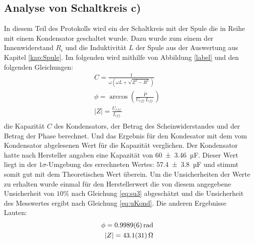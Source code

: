 \subsection{Analyse von Schaltkreis c)}
In diesem Teil des Protokolls wird ein der Schaltkreis mit der Spule die in Reihe mit einem Kondensator geschaltet wurde.
Dazu wurde zum einem der Innenwiderstand $R_i$ und die Induktivität $L$ der Spule aus der Auswertung aus Kapitel \ref{kap:Spule}.
Im folgenden wird mithilfe von Abbildung \ref{label}
und den folgenden Gleichungen:
\begin{align}
C=\frac{1}{\omega (\omega L+\sqrt{Z^2-R^2})}\\	
\phi = \arccos\left(\frac{\bar{P}}{U_{eff.}I_{eff.}}\right)\\
	|Z|=\frac{U_{eff.}}{I_{eff.}}\\	
\end{align}
die Kapazität $C$ des Kondensators, der Betrag des Scheinwiderstandes und der Betrag der Phase berechnet. Und das Ergebnis für den Kondesator mit dem vom Kondensator abgelesenen Wert für die Kapazität verglichen.
Der Kondensator hatte nach Hersteller angaben eine Kapazität von \SI{60+-3.46}{µF}.
Dieser Wert liegt in der $1\sigma$-Umgebung des errechneten Wertes: \SI{57.4+-3.8}{µF} und stimmt somit gut mit dem Theoretischen Wert überein.
Um die Unsicherheiten der Werte zu erhalten wurde einmal für den Herstellerwert die von diesem angegebene Unsicherheit von $10\%$ nach Gleichung
\ref{eq:su3} abgeschätzt und die Unsicherheit des Messwertes ergibt nach Gleichung \ref{eq:uKond}.
Die anderen Ergebnisse Lauten:
\begin{align}
	\phi=\SI{0.9989+-0.0006}{rad}\\
	|Z|=\SI{43.1+-3.1}{\ohm}
\end{align}
